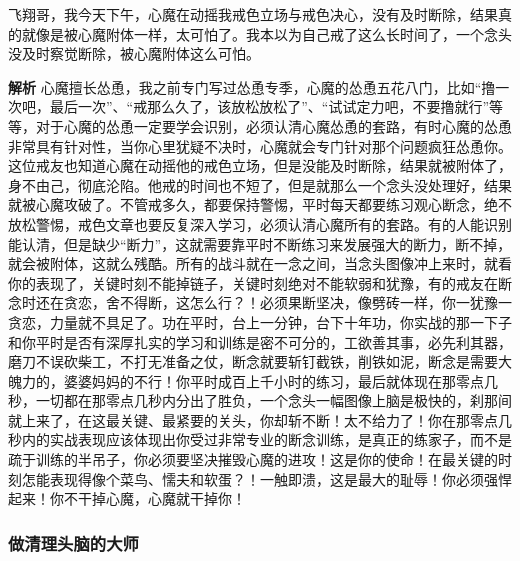 \begin{case}
    飞翔哥，我今天下午，心魔在动摇我戒色立场与戒色决心，没有及时断除，结果真的就像是被心魔附体一样，太可怕了。我本以为自己戒了这么长时间了，一个念头没及时察觉断除，被心魔附体这么可怕。

    \textbf{解析} 心魔擅长怂恿，我之前专门写过怂恿专季，心魔的怂恿五花八门，比如“撸一次吧，最后一次”、“戒那么久了，该放松放松了”、“试试定力吧，不要撸就行”等等，对于心魔的怂恿一定要学会识别，必须认清心魔怂恿的套路，有时心魔的怂恿非常具有针对性，当你心里犹疑不决时，心魔就会专门针对那个问题疯狂怂恿你。这位戒友也知道心魔在动摇他的戒色立场，但是没能及时断除，结果就被附体了，身不由己，彻底沦陷。他戒的时间也不短了，但是就那么一个念头没处理好，结果就被心魔攻破了。不管戒多久，都要保持警惕，平时每天都要练习观心断念，绝不放松警惕，戒色文章也要反复深入学习，必须认清心魔所有的套路。有的人能识别能认清，但是缺少“断力”，这就需要靠平时不断练习来发展强大的断力，断不掉，就会被附体，这就么残酷。所有的战斗就在一念之间，当念头图像冲上来时，就看你的表现了，关键时刻不能掉链子，关键时刻绝对不能软弱和犹豫，有的戒友在断念时还在贪恋，舍不得断，这怎么行？！必须果断坚决，像劈砖一样，你一犹豫一贪恋，力量就不具足了。功在平时，台上一分钟，台下十年功，你实战的那一下子和你平时是否有深厚扎实的学习和训练是密不可分的，工欲善其事，必先利其器，磨刀不误砍柴工，不打无准备之仗，断念就要斩钉截铁，削铁如泥，断念是需要大魄力的，婆婆妈妈的不行！你平时成百上千小时的练习，最后就体现在那零点几秒，一切都在那零点几秒内分出了胜负，一个念头一幅图像上脑是极快的，刹那间就上来了，在这最关键、最紧要的关头，你却斩不断！太不给力了！你在那零点几秒内的实战表现应该体现出你受过非常专业的断念训练，是真正的练家子，而不是疏于训练的半吊子，你必须要坚决摧毁心魔的进攻！这是你的使命！在最关键的时刻怎能表现得像个菜鸟、懦夫和软蛋？！一触即溃，这是最大的耻辱！你必须强悍起来！你不干掉心魔，心魔就干掉你！
\end{case}

\subsubsection{做清理头脑的大师}

